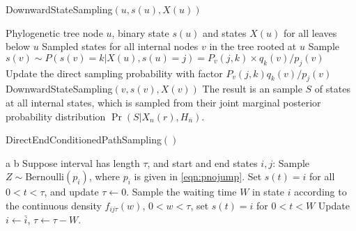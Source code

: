 \documentclass[11pt]{article}
\begin{document}
\begin{algorithm}[h!]
  \begin{algorithmic}[1]
    \caption{DownwardStateSampling$(u, s(u), X(u))$}\label{alg:topdown}
    \REQUIRE Phylogenetic tree node $u$, binary state $s(u)$ and
    states $X(u)$ for all leaves below $u$
    \ENSURE Sampled states for all internal nodes $v$ in the tree
    rooted at $u$
    \STATE Sample $s(v) \sim P(s(v)=k|X(u), s(u)=j) = P_v(j, k) \times q_k(v)\slash p_j(v)$
    \STATE Update the direct sampling probability with factor $P_v(j,k)q_k(v)\slash p_j(v)$
    \STATE DownwardStateSampling$(v, s(v), X(v))$
    \ENDFOR
    \STATE The result is an sample $S$ of states at all internal states,
    which is sampled from their joint marginal posterior probability
    distribution $\Pr(S| X_n(r), H_{\overline{n}}) $.
  \end{algorithmic}
\end{algorithm}

\begin{algorithm}[h!]
  \begin{algorithmic}[1]
    \caption{DirectEndConditionedPathSampling$()$}\label{alg:samplepath}
    \REQUIRE a
    \ENSURE b
    \STATE Suppose interval has length $\tau$, and start and end states $i, j$:
    \STATE Sample $Z\sim \text{Bernoulli}(p_i)$, where
    $p_i$ is given in \eqref{eqn:pnojump}.
    \STATE Set $s(t) = i$ for all $0 < t < \tau$, and update $\tau \gets 0$.
    \ENDIF
    \ENDIF
    \STATE Sample the waiting time $W$ in state $i$ according to the continuous
    density $f_{ij\tau}(w)$, $0< w < \tau$, set $s(t) = i$ for $0 < t < W$
    \STATE Update $i \gets \bar{i}$, $\tau \gets \tau - W$.
    \ENDIF
    \ENDWHILE
  \end{algorithmic}
\end{algorithm}
\end{document}
